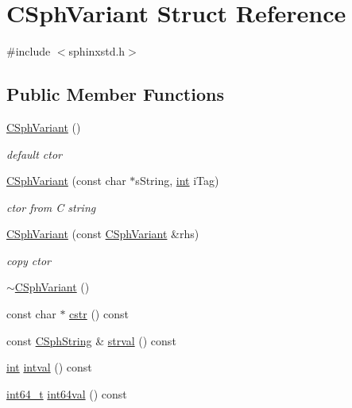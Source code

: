 \hypertarget{structCSphVariant}{\section{C\-Sph\-Variant Struct Reference}
\label{structCSphVariant}
}


{\ttfamily \#include $<$sphinxstd.\-h$>$}

\subsection*{Public Member Functions}
\begin{DoxyCompactItemize}
\item 
\hyperlink{structCSphVariant_add1fa7895b6eaa9c69a7aac34c620eae}{C\-Sph\-Variant} ()
\begin{DoxyCompactList}\small\item\em default ctor \end{DoxyCompactList}\item 
\hyperlink{structCSphVariant_aa66fbb7f61e6c83786b658d76f2c41f6}{C\-Sph\-Variant} (const char $\ast$s\-String, \hyperlink{sphinxexpr_8cpp_a4a26e8f9cb8b736e0c4cbf4d16de985e}{int} i\-Tag)
\begin{DoxyCompactList}\small\item\em ctor from C string \end{DoxyCompactList}\item 
\hyperlink{structCSphVariant_a7812b2079266f226d90eb4d969b0c6ed}{C\-Sph\-Variant} (const \hyperlink{structCSphVariant}{C\-Sph\-Variant} \&rhs)
\begin{DoxyCompactList}\small\item\em copy ctor \end{DoxyCompactList}\item 
\hyperlink{structCSphVariant_abc51cf9304d5cd4bdd165c675b95fb10}{$\sim$\-C\-Sph\-Variant} ()
\item 
const char $\ast$ \hyperlink{structCSphVariant_a367fb885c87799b27964d8d354e9a31f}{cstr} () const 
\item 
const \hyperlink{structCSphString}{C\-Sph\-String} \& \hyperlink{structCSphVariant_ab46f8245c187ccc12dae8f1b11a3c430}{strval} () const 
\item 
\hyperlink{sphinxexpr_8cpp_a4a26e8f9cb8b736e0c4cbf4d16de985e}{int} \hyperlink{structCSphVariant_a7750e429e892dbaab5abbc67033fd9d5}{intval} () const 
\item 
\hyperlink{sphinxstd_8h_a996e72f71b11a5bb8b3b7b6936b1516d}{int64\-\_\-t} \hyperlink{structCSphVariant_aa699769137810248a9b17a6b407928c6}{int64val} () const 

\end{DoxyCompactItemize}
